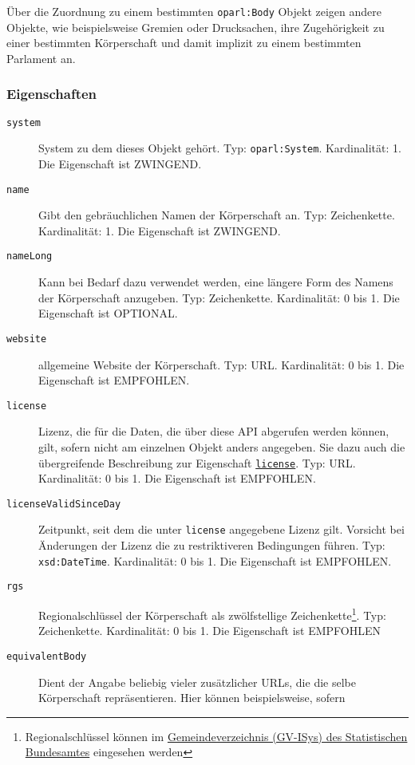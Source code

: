 \documentclass[,a4paper]{article}
\begin{document}
Über die Zuordnung zu einem bestimmten \texttt{oparl:Body} Objekt zeigen
andere Objekte, wie beispielsweise Gremien oder Drucksachen, ihre
Zugehörigkeit zu einer bestimmten Körperschaft und damit implizit zu
einem bestimmten Parlament an.

\subsubsection{Eigenschaften}\label{eigenschaften-1}

\begin{description}
\item[\texttt{system}]
System zu dem dieses Objekt gehört. Typ: \texttt{oparl:System}.
Kardinalität: 1. Die Eigenschaft ist ZWINGEND.
\item[\texttt{name}]
Gibt den gebräuchlichen Namen der Körperschaft an. Typ: Zeichenkette.
Kardinalität: 1. Die Eigenschaft ist ZWINGEND.
\item[\texttt{nameLong}]
Kann bei Bedarf dazu verwendet werden, eine längere Form des Namens der
Körperschaft anzugeben. Typ: Zeichenkette. Kardinalität: 0 bis 1. Die
Eigenschaft ist OPTIONAL.
\item[\texttt{website}]
allgemeine Website der Körperschaft. Typ: URL. Kardinalität: 0 bis 1.
Die Eigenschaft ist EMPFOHLEN.
\item[\texttt{license}]
Lizenz, die für die Daten, die über diese API abgerufen werden können,
gilt, sofern nicht am einzelnen Objekt anders angegeben. Sie dazu auch
die übergreifende Beschreibung zur Eigenschaft
\hyperref[eigenschaftux5flicense]{\texttt{license}}. Typ: URL.
Kardinalität: 0 bis 1. Die Eigenschaft ist EMPFOHLEN.
\item[\texttt{licenseValidSinceDay}]
Zeitpunkt, seit dem die unter \texttt{license} angegebene Lizenz gilt.
Vorsicht bei Änderungen der Lizenz die zu restriktiveren Bedingungen
führen. Typ: \texttt{xsd:DateTime}. Kardinalität: 0 bis 1. Die
Eigenschaft ist EMPFOHLEN.
\item[\texttt{rgs}]
Regionalschlüssel der Körperschaft als zwölfstellige
Zeichenkette\footnote{Regionalschlüssel können im
  \href{https://www.destatis.de/DE/ZahlenFakten/LaenderRegionen/Regionales/Gemeindeverzeichnis/Gemeindeverzeichnis.html}{Gemeindeverzeichnis
  (GV-ISys) des Statistischen Bundesamtes} eingesehen werden}. Typ:
Zeichenkette. Kardinalität: 0 bis 1. Die Eigenschaft ist EMPFOHLEN
\item[\texttt{equivalentBody}]
Dient der Angabe beliebig vieler zusätzlicher URLs, die die selbe
Körperschaft repräsentieren. Hier können beispielsweise, sofern

\end{description}
\end{document}
